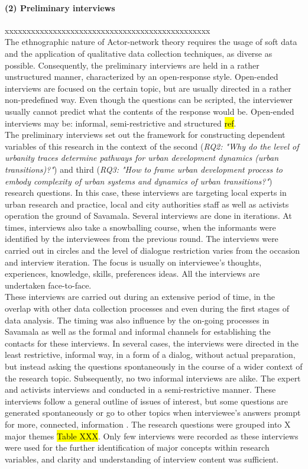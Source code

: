 \documentclass[11pt]{report}
\begin{document}
\paragraph{(2) Preliminary interviews} xxxxxxxxxxxxxxxxxxxxxxxxxxxxxxxxxxxxxxxxxxxxxxx
\\
The ethnographic nature of Actor-network theory requires the usage of soft data and the application of qualitative data collection techniques, as diverse as possible. Consequently, the preliminary interviews are held in a rather unstructured manner, characterized by an open-response style. Open-ended interviews are focused on the certain topic, but are usually directed in a rather non-predefined way. Even though the questions can be scripted, the interviewer usually cannot predict what the contents of the response would be. Open-ended interviews may be: informal, semi-restrictive and structured \hl{ref}.
\\
The preliminary interviews set out the framework for constructing dependent variables of this research in the context of the second (\textit{RQ2: "Why do the level of urbanity traces determine pathways for urban development dynamics (urban transitions)?"}) and third (\textit{RQ3: "How to frame urban development process to embody complexity of urban systems and dynamics of urban transitions?"}) research questions. In this case, these interviews are targeting local experts in urban research and practice, local and city authorities staff as well as activists operation the ground of Savamala. Several interviews are done in iterations. At times, interviews also take a snowballing course, when the informants were identified by the interviewees from the previous round. The interviews were carried out in circles and the level of dialogue restriction varies from the occasion and interview iteration. The focus is usually on interviewee's thoughts, experiences, knowledge, skills, preferences ideas. All the interviews are undertaken face-to-face.
\\
These interviews are carried out during an extensive period of time, in the overlap with other data collection processes and even during the first stages of data analysis. The timing was also influence by the on-going processes in Savamala as well as the formal and informal channels for establishing the contacts for these interviews. In several cases, the interviews were directed in the least restrictive, informal way, in a form of a dialog, without actual preparation, but instead asking the questions spontaneously in the course of a wider context of the research topic. Subsequently, no two informal interviews are alike. The expert and activists interviews and conducted in a semi-restrictive manner. These interviews follow a general outline of issues of interest, but some questions are generated spontaneously or go to other topics when interviewee's answers prompt for more, connected, information . The research questions were grouped into X major themes \hl{Table XXX}. Only few interviews were recorded as these interviews were used for the further identification of major concepts within research variables, and clarity and understanding of interview content was sufficient. 
\end{document}
